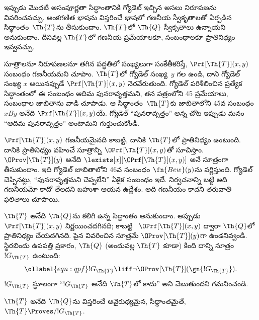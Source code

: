 \documentclass[../../../include/open-logic-section]{subfiles}
\begin{document}


ఇప్పుడు మొదటి అసంపూర్ణతా సిద్ధాంతానికి గ్యోడెల్ ఇచ్చిన అసలు నిరూపణను
వివరించవచ్చు. అంకగణిత భాషను విస్తరించే భాషలో గణనీయ స్వీకృతాలతో
ఏర్పడిన సిద్ధాంతం~$\Th{T}$ను తీసుకుందాం. $\Th{T}$లో $\Th{Q}$ స్వీకృతాలు
ఉన్నాయని అనుకుందాం. దీనివల్ల $\Th{T}$లో గణనీయ ప్రమేయాలకూ, సంబంధాలకూ
ప్రాతినిధ్యం ఇవ్వవచ్చు.

సూత్రాలనూ నిరూపణలనూ తగిన పద్ధతిలో సంఖ్యలుగా సంకేతీకరిస్తే,
$\Prf[\Th{T}](x,y)$ సంబంధం గణనీయమని చూపాం. $\Th{T}$లో గ్యోడెల్ సంఖ్య~$y$
గల   ఉండి, దాని గ్యోడెల్ సంఖ్య
$x$ అయినప్పుడే $\Prf[\Th{T}](x,y)$ నెరవేరుతుంది. గ్యోడెల్ పరిశీలించిన
ప్రత్యేక సిద్ధాంతంలో ఈ సంబంధం ఆదిమ పునరావృత్తమని, తన పత్రంలోని 45 ప్రమేయాలు,
సంబంధాల జాబితాను వాడి చూపాడు. ఆ సిద్ధాంతం~$\Th{T}$కు జాబితాలోని 45వ
సంబంధం $x B y$ అనేది $\Prf[\Th{T}](x,y)$యే. గ్యోడెల్ ``పునరావృత్తం''
అన్న చోట ఇప్పుడు మనం ``ఆదిమ పునరావృత్తం'' అంటామని గుర్తుంచుకోండి.

$\Prf[\Th{T}](x,y)$ గణనీయమైనది కాబట్టి, దానికి $\Th{T}$లో ప్రాతినిధ్యం
ఉంటుంది. దానికి ప్రాతినిధ్యం వహించే సూత్రాన్ని $\OPrf[\Th{T}](x,y)$తో
సూచిస్తాం. $\OProv[\Th{T}](y)$ అనేది
$\lexists[x][\OPrf[\Th{T}](x,y)]$ అనే సూత్రంగా తీసుకుందాం. ఇది గ్యోడెల్
జాబితాలోని 46వ సంబంధం $\fn{Bew}(y)$ను వర్ణిస్తుంది. గ్యోడెల్ చెప్పినట్లు,
``పునరావృత్తమని చెప్పలేని'' ఏకైక సంబంధం ఇదే. నిర్వచనాన్ని బట్టి అది
గణనీయమో కాదో తేలదని బహుశా ఆయన ఉద్దేశం. అది గణనీయం కాదని తరువాతి
ఫలితాలు చూపాయి.

$\Th{T}$ అనేది $\Th{Q}$ను కలిగి ఉన్న 
సిద్ధాంతం అనుకుందాం. అప్పుడు $\Prf[\Th{T}](x, y)$ నిర్ణయించదగినది; కాబట్టి
~$\OPrf[\Th{T}](x, y)$ ద్వారా $\Th{Q}$లో ప్రాతినిధ్యం
చేయదగినది. పైన వివరించిన సూత్రమే $\OProv[\Th{T}](y)$గా ఉండనివ్వండి.
స్థిరబిందు ఉపపత్తి ప్రకారం, $\Th{Q}$ (అందువల్ల $\Th{T}$ కూడా) కింది
దాన్ని  సూత్రం $!G_\Th{T}$ ఉంటుంది:
\begin{equation}
\ollabel{eqn:qpf}
!G_\Th{T} \liff \lnot \OProv[\Th{T}](\gn{!G_\Th{T}}).
\end{equation}
$!G_\Th{T}$ స్థూలంగా ``$!G_\Th{T}$ అనేది $\Th{T}$లో
 కాదు'' అని చెబుతుందని గమనించండి.

\begin{lem}
$\Th{T}$ అనేది $\Th{Q}$ను విస్తరించే అవైరుధ్యమైన,
 సిద్ధాంతమైతే, $\Th{T} \Proves/ !G_\Th{T}$.
\end{lem}
\end{document}
